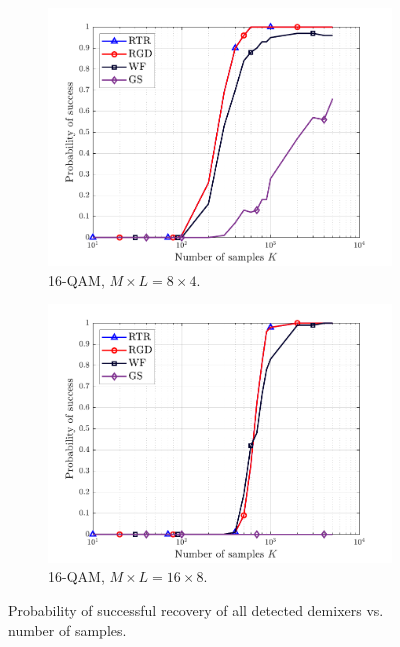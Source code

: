 \begin{figure}[htp]
\begin{subfigure}{0.48\linewidth}
		\centering
		\includegraphics[width=0.95\linewidth]{./figs/rocma_figs/ROCMA_MSR_TI_QgSt_success_16QAM_L=4_M=8_J=4_nSim_100.pdf}
		\caption{16-QAM, $M\times L = 8\times4$.}\label{rocma:fig:CMA_ROCMA_success_8x4_16qam}
	\end{subfigure}
	\begin{subfigure}{0.48\linewidth}
		\centering							
		\includegraphics[width=0.95\linewidth]{./figs/rocma_figs/ROCMA_MSR_TI_QgSt_success_16QAM_L=8_M=16_J=8_nSim_100.pdf}
		\caption{16-QAM, $M\times L = 16\times8$.}\label{rocma:fig:CMA_ROCMA_success_16x8_16qam}
	\end{subfigure}
	\caption{Probability of successful recovery of all detected demixers vs. number of samples.}
	\label{rocma:fig:CMA_ROCMA_success}
\end{figure}


